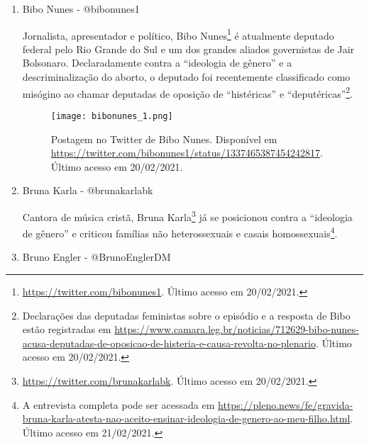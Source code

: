 \documentclass[
	12pt,				%
	openright,			%
	twoside,			%
	a4paper,			%
	english,			%
	brazil				%
	]{abntex2}
\begin{document}
\begin{anexosenv}
\begin{enumerate}
 
 \begin{figure}[!htbp]
    \centering
    \texttt{[image: biak\_3.png]}
    \caption{Postagem no Twitter de Bia Kicis. Disponível em \url{https://twitter.com/Biakicis/status/831530454100623361}. Último acesso em 20/02/2021.}
 \end{figure}
  
  \item Bibo Nunes - @bibonunes1
  
  Jornalista, apresentador e político, Bibo Nunes\footnote{\url{https://twitter.com/bibonunes1}. Último acesso em 20/02/2021.} é atualmente deputado federal pelo Rio Grande do Sul e um dos grandes aliados governistas de Jair Bolsonaro. Declaradamente contra a ``ideologia de gênero'' e a descriminalização do aborto, o deputado foi recentemente classificado como misógino ao chamar deputadas de oposição de ``histéricas'' e ``deputéricas''\footnote{Declarações das deputadas feministas sobre o episódio e a resposta de Bibo estão registradas em \url{https://www.camara.leg.br/noticias/712629-bibo-nunes-acusa-deputadas-de-oposicao-de-histeria-e-causa-revolta-no-plenario}. Último acesso em 20/02/2021.}.
 
 \begin{figure}[!htbp]
    \centering
    \texttt{[image: bibonunes\_1.png]}
    \caption{Postagem no Twitter de Bibo Nunes. Disponível em \url{https://twitter.com/bibonunes1/status/1337465387454242817}. Último acesso em 20/02/2021.}
 \end{figure}
 
  \item Bruna Karla - @brunakarlabk
  
  Cantora de música cristã, Bruna Karla\footnote{\url{https://twitter.com/brunakarlabk}. Último acesso em 20/02/2021.} já se posicionou contra a ``ideologia de gênero'' e criticou famílias não heterossexuais e casais homossexuais\footnote{A entrevista completa pode ser acessada em \url{https://pleno.news/fe/gravida-bruna-karla-atesta-nao-aceito-ensinar-ideologia-de-genero-ao-meu-filho.html}. Último acesso em 21/02/2021.}.

  \item Bruno Engler - @BrunoEnglerDM\label{engler}
  

\end{enumerate}
\end{anexosenv}
\end{document}
